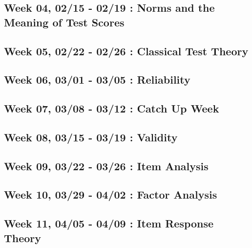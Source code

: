 \hypertarget{week-04-0215---0219-norms-and-the-meaning-of-test-scores}{%
\subsection{Week 04, 02/15 - 02/19 : Norms and the Meaning of Test Scores}\label{week-04-0215---0219-norms-and-the-meaning-of-test-scores}}

\hypertarget{week-05-0222---0226-classical-test-theory}{%
\subsection{Week 05, 02/22 - 02/26 : Classical Test Theory}\label{week-05-0222---0226-classical-test-theory}}

\hypertarget{week-06-0301---0305-reliability}{%
\subsection{Week 06, 03/01 - 03/05 : Reliability}\label{week-06-0301---0305-reliability}}

\hypertarget{week-07-0308---0312-catch-up-week}{%
\subsection{Week 07, 03/08 - 03/12 : Catch Up Week}\label{week-07-0308---0312-catch-up-week}}

\hypertarget{week-08-0315---0319-validity}{%
\subsection{Week 08, 03/15 - 03/19 : Validity}\label{week-08-0315---0319-validity}}

\hypertarget{week-09-0322---0326-item-analysis}{%
\subsection{Week 09, 03/22 - 03/26 : Item Analysis}\label{week-09-0322---0326-item-analysis}}

\hypertarget{week-10-0329---0402-factor-analysis}{%
\subsection{Week 10, 03/29 - 04/02 : Factor Analysis}\label{week-10-0329---0402-factor-analysis}}

\hypertarget{week-11-0405---0409-item-response-theory}{%
\subsection{Week 11, 04/05 - 04/09 : Item Response Theory}\label{week-11-0405---0409-item-response-theory}}

